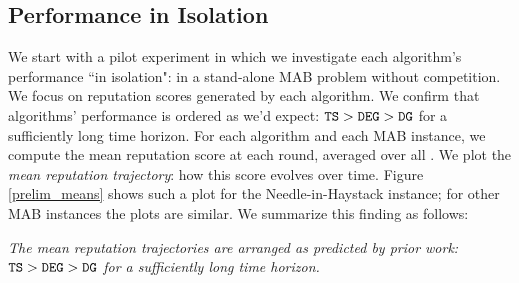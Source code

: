 \documentclass[../competing_bandits.tex]{subfiles}
\begin{document}
\subsection{Performance in Isolation}\label{sec:isolation}

We start with a pilot experiment in which we investigate each algorithm's performance ``in isolation": in a stand-alone MAB problem without competition. We focus on reputation scores generated by each algorithm. We confirm that algorithms' performance is ordered as we'd expect:
    $\mathtt{TS} > \mathtt{DEG} > \mathtt{DG}$
for a sufficiently long time horizon. For each algorithm and each MAB instance, we compute the mean reputation score at each round, averaged over all \MRVs. We plot the \emph{mean reputation trajectory}: how this score evolves over time. Figure \ref{prelim_means} shows such a plot for the Needle-in-Haystack instance; for other MAB instances the plots are similar. We summarize this finding as follows:

\begin{finding}
\textit{The mean reputation trajectories are arranged as predicted by prior work:
    $\mathtt{TS} > \mathtt{DEG} > \mathtt{DG}$ for a sufficiently long time horizon.}
\end{finding}
\end{document}
